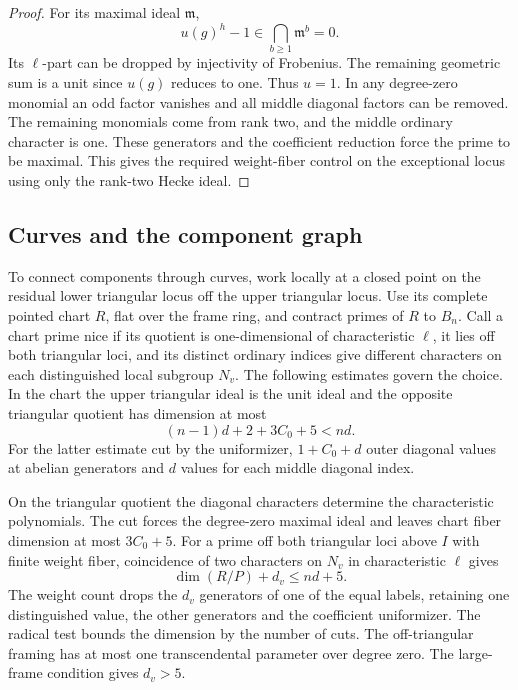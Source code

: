 \begin{proof}
For its maximal ideal \(\mathfrak m\),
\[
 u(g)^h-1\in\bigcap_{b\ge1}\mathfrak m^b=0 .
\] Its \(\ell\)-part
can be dropped by injectivity of Frobenius. The remaining geometric
sum is a unit since \(u(g)\) reduces to one. Thus \(u=1\).
In any degree-zero monomial an odd factor vanishes and all middle
diagonal factors can be removed. The remaining monomials come
from rank two, and the middle ordinary character is one. These
generators and the coefficient reduction force the prime to be
maximal. This gives the required weight-fiber control on the
exceptional locus using only the rank-two Hecke ideal.

\end{proof}

\subsection{Curves and the component graph}

To connect components through curves, work locally at a closed point on the residual
lower triangular locus off the upper triangular locus. Use its complete pointed chart
\(R\), flat over the frame ring, and contract primes of \(R\)
to \(B_n\). Call a chart prime nice if its quotient is
one-dimensional of characteristic \(\ell\), it lies off both
triangular loci, and its distinct ordinary indices give
different characters on each distinguished local subgroup \(N_v\).
The following estimates govern the choice. In the chart the
upper triangular ideal is the unit ideal and the opposite
triangular quotient has dimension at most
\[
                   (n-1)d+2+3C_0+5 < nd .
\]
For the latter estimate cut by the uniformizer, \(1+C_0+d\)
outer diagonal values at abelian generators and \(d\) values for
each middle diagonal index.

On the triangular quotient the
diagonal characters determine the characteristic polynomials.
The cut forces the degree-zero maximal ideal and leaves chart
fiber dimension at most \(3C_0+5\). For a prime off both
triangular loci above \(I\) with finite weight fiber, coincidence
of two characters on \(N_v\) in characteristic \(\ell\) gives
\[
                    \dim(R/P)+d_v\le nd+5 .
\]
The weight count drops the \(d_v\) generators of one of the
equal labels, retaining one distinguished value, the other
generators and the coefficient uniformizer. The radical test
bounds the dimension by the number of cuts. The off-triangular
framing has at most one transcendental parameter over degree
zero. The large-frame condition gives \(d_v>5\).

